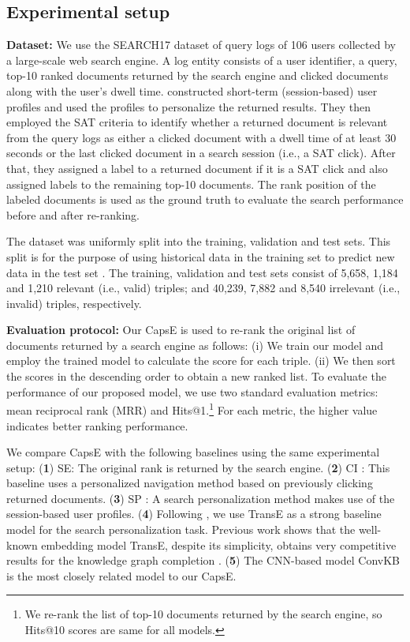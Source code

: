 \documentclass[11pt,a4paper]{article}
\begin{document}
\subsection{Experimental setup}

\noindent\textbf{Dataset:} 
We use the SEARCH17 dataset \citep{vu2017search} of query logs of 106 users collected by a large-scale web search engine.
A log entity consists of a user identifier, a query, top-10 ranked documents returned by the search engine and clicked documents along with the user's dwell time. \citet{vu2017search} constructed short-term (session-based) user profiles and used the profiles to personalize the returned results.
They then employed the SAT criteria \citep{FoxE2005} to identify whether a returned document is relevant from the query logs as either a clicked document with a dwell time of at least 30 seconds or the last clicked document in a search session (i.e., a SAT click). 
After that, they assigned a  label to a returned document if it is a SAT click and also assigned  labels to the remaining top-10 documents.
The rank position of the  labeled documents is used as the ground truth to evaluate the search performance before and after re-ranking.



The dataset was uniformly split into the training, validation and test sets. This split is for the purpose of using historical data in the training set to predict new data in the test set \citep{vu2017search}. The training, validation and test sets consist of 5,658, 1,184 and 1,210 relevant (i.e., valid) triples; and 40,239, 7,882 and 8,540 irrelevant (i.e., invalid) triples, respectively.

\noindent\textbf{Evaluation protocol:} 
Our CapsE is used to re-rank the original list of documents returned by a search engine as follows: (i) We train our model and employ the trained model to calculate the score for each   triple. (ii) We then sort the scores in the descending order to obtain a new ranked list.
To evaluate the performance of our proposed model, we use two standard evaluation metrics: mean reciprocal rank (MRR) and Hits@1.\footnote{We re-rank the list of top-10 documents returned by the search engine, so Hits@10 scores are same for all models.}
For each metric, the higher value indicates better ranking performance.

We compare CapsE with the following baselines using the same experimental setup: (\textbf{1}) SE: The original rank is returned by the search engine. (\textbf{2}) CI \citep{Teevan2011}: This baseline uses a personalized navigation method based on previously clicking returned documents. (\textbf{3}) SP \citep{Bennett2012,Vu2015}: A search personalization method makes use of the session-based user profiles. (\textbf{4}) 
Following \citet{vu2017search}, we use TransE as a strong baseline model for the search personalization task.  Previous work shows that the well-known embedding model TransE, despite its simplicity, obtains very competitive results for the knowledge graph completion \citep{lin-EtAl:2015:EMNLP1,nickel2016holographic,Trouillon2016,Nguyen2016,Nguyen2018}. (\textbf{5}) The CNN-based model ConvKB is the most closely related model to our CapsE.
\end{document}

